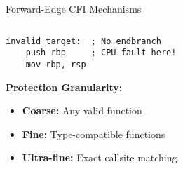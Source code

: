 \documentclass[aspectratio=169,12pt]{beamer}
\begin{document}
\begin{frame}[fragile]{Forward-Edge CFI Mechanisms}
\begin{columns}
\begin{column}{0.5\textwidth}
\begin{tcolorbox}[colback=gray!10]
\begin{verbatim}
invalid_target:  ; No endbranch
    push rbp     ; CPU fault here!
    mov rbp, rsp
                \end{verbatim}
            \end{tcolorbox}
            
            \textbf{Protection Granularity:}
            \begin{itemize}
                \item \textbf{Coarse:} Any valid function
                \item \textbf{Fine:} Type-compatible functions
                \item \textbf{Ultra-fine:} Exact callsite matching
            \end{itemize}
        \end{column}
    \end{columns}
\end{frame}
\end{document}
